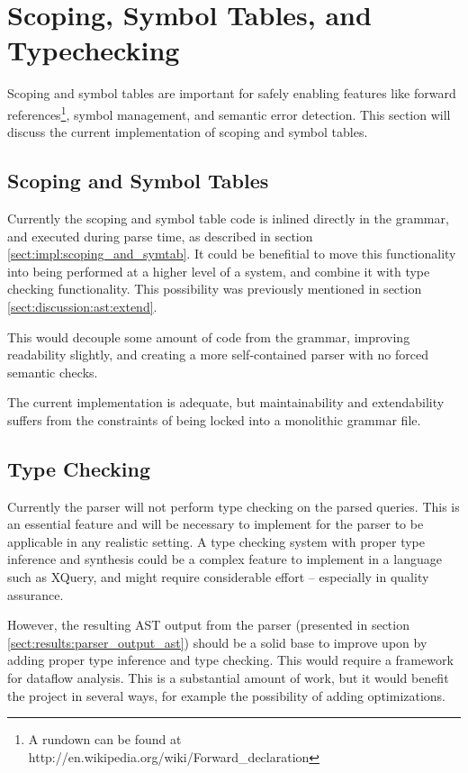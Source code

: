 \section{Scoping, Symbol Tables, and Typechecking}
Scoping and symbol tables are important for safely enabling features like
forward references\footnote{A rundown can be found
at http://en.wikipedia.org/wiki/Forward\_declaration},
symbol management, and semantic error detection. This section will discuss the
current implementation of scoping and symbol tables.

\subsection{Scoping and Symbol Tables}
\label{sect:discussion:scoping_and_symtab}
Currently the scoping and symbol table code is inlined directly in the grammar, and executed during parse time, as described in section
\ref{sect:impl:scoping_and_symtab}. It could be benefitial to move this
functionality into being performed at a higher level of a system, and combine it with type checking
functionality. This possibility was previously mentioned in section
\ref{sect:discussion:ast:extend}.

This would decouple some amount of code from the grammar, improving readability
slightly, and creating a more self-contained parser with no forced semantic
checks.

The current implementation is adequate, but maintainability and extendability
suffers from the constraints of being locked into a monolithic grammar file.

\subsection{Type Checking}
Currently the parser will not perform type checking on the parsed queries. This
is an essential feature and will be necessary to implement for the parser to be
applicable in any realistic setting. A type checking system with proper type
inference and synthesis\cite{compiler_tech} could be a
complex feature to implement in a language such as XQuery, and might require
considerable effort -- especially in quality assurance. 

However, the resulting AST output from the parser (presented in section
\ref{sect:results:parser_output_ast}) should be a solid base to improve upon by
adding proper type inference and type checking. This would require a framework
for dataflow analysis. This is a substantial amount of work, but it would
benefit the project in several ways, for example the possibility of adding
optimizations.